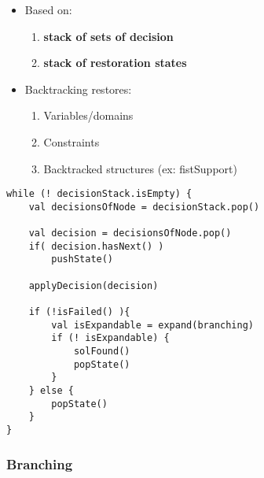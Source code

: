 \begin{itemize}
    \item Based on:
    \begin{enumerate}
            \item \textbf{stack of sets of decision}
            \item \textbf{stack of restoration states}
        \end{enumerate}
    \item Backtracking restores:
        \begin{enumerate}
            \item Variables/domains
            \item Constraints
            \item Backtracked structures (ex: fistSupport)
        \end{enumerate}
\end{itemize}

\begin{lstlisting}[caption=Depth First backtracking search]
while (! decisionStack.isEmpty) {
    val decisionsOfNode = decisionStack.pop()

    val decision = decisionsOfNode.pop()
    if( decision.hasNext() )
        pushState()

    applyDecision(decision)

    if (!isFailed() ){
        val isExpandable = expand(branching)
        if (! isExpandable) {
            solFound()
            popState()
        }
    } else {
        popState()
    }
}
\end{lstlisting}


\subsubsection{Branching}

